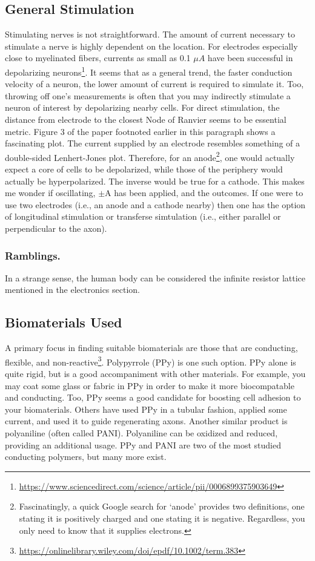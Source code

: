 \documentclass[12pt]{report}
\begin{document}
\subsection{General Stimulation}
Stimulating nerves is not straightforward. The amount of current necessary to stimulate a nerve is highly dependent on the location. For electrodes especially close to myelinated fibers, currents as small as 0.1 $\mu A$ have been successful in depolarizing neurons\footnote{\url{https://www.sciencedirect.com/science/article/pii/0006899375903649}}. It seems that as a general trend, the faster conduction velocity of a neuron, the lower amount of current is required to simulate it. Too, throwing off one's measurements is often that you may indirectly stimulate a neuron of interest by depolarizing nearby cells. For direct stimulation, the distance from electrode to the closest Node of Ranvier seems to be essential metric. Figure 3 of the paper footnoted earlier in this paragraph shows a fascinating plot. The current supplied by an electrode resembles something of a double-sided Lenhert-Jones plot. Therefore, for an anode\footnote{Fascinatingly, a quick Google search for `anode' provides two definitions, one stating it is positively charged and one stating it is negative. Regardless, you only need to know that it supplies electrons.}, one would actually expect a core of cells to be depolarized, while those of the periphery would actually be hyperpolarized. The inverse would be true for a cathode. This makes me wonder if oscillating, $\pm$A has been applied, and the outcomes. If one were to use two electrodes (i.e., an anode and a cathode nearby) then one has the option of longitudinal stimulation or transferse simtulation (i.e., either parallel or perpendicular to the axon).

\subsubsection{Ramblings.}
In a strange sense, the human body can be considered the infinite resistor lattice mentioned in the electronics section. 

\subsection{Biomaterials Used}
A primary focus in finding suitable biomaterials are those that are conducting, flexible, and non-reactive\footnote{\url{https://onlinelibrary.wiley.com/doi/epdf/10.1002/term.383}}. Polypyrrole (PPy) is one such option. PPy alone is quite rigid, but is a good accompaniment with other materials. For example, you may coat some glass or fabric in PPy in order to make it more biocompatable and conducting. Too, PPy seems a good candidate for boosting cell adhesion to your biomaterials. Others have used PPy in a tubular fashion, applied some current, and used it to guide regenerating axons. Another similar product is polyaniline (often called PANI). Polyaniline can be oxidized and reduced, providing an additional usage. PPy and PANI are two of the most studied conducting polymers, but many more exist.\newline
\end{document}
